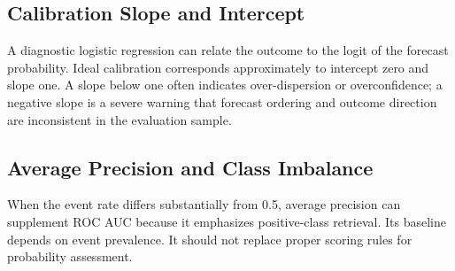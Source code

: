\documentclass[11pt]{article}
\begin{document}
\subsection{Calibration Slope and Intercept}
A diagnostic logistic regression can relate the outcome to the logit of the forecast probability. Ideal calibration corresponds approximately to intercept zero and slope one. A slope below one often indicates over-dispersion or overconfidence; a negative slope is a severe warning that forecast ordering and outcome direction are inconsistent in the evaluation sample.

\subsection{Average Precision and Class Imbalance}
When the event rate differs substantially from 0.5, average precision can supplement ROC AUC because it emphasizes positive-class retrieval. Its baseline depends on event prevalence. It should not replace proper scoring rules for probability assessment.
\end{document}
